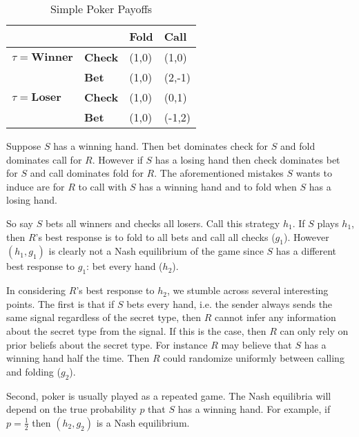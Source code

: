 \documentclass{article}
\begin{document}
\begin{table}[H]
	\centering
	\caption{Simple Poker Payoffs}
	\label{simplepokerpayoffs}
	\begin{tabular}{ll|l|l|}
		\cline{3-4}
		&       & \textbf{Fold} & \textbf{Call} \\ \hline
		\multicolumn{1}{|l|}{$\tau=\textbf{Winner}$} & \textbf{Check} & (1,0)  & (1,0)  \\ \cline{2-4}
		\multicolumn{1}{|l|}{}        & \textbf{Bet}   & (1,0)  & (2,-1)  \\ \hline
		\multicolumn{1}{|l|}{$\tau=\textbf{Loser}$}  & \textbf{Check} & (1,0)  & (0,1)  \\ \cline{2-4}
		\multicolumn{1}{|l|}{}        & \textbf{Bet}   & (1,0)  & (-1,2) \\ \hline
	\end{tabular}
\end{table}

Suppose $S$ has a winning hand. Then bet dominates check for $S$ and fold dominates call for $R$. However if $S$ has a losing hand then check dominates bet for $S$ and call dominates fold for $R$. The aforementioned mistakes $S$ wants to induce are for $R$ to call with $S$ has a winning hand and to fold when $S$ has a losing hand.

So say $S$ bets all winners and checks all losers. Call this strategy $h_1$. If $S$ plays $h_1$, then $R$'s best response is to fold to all bets and call all checks ($g_1$). However $(h_1, g_1)$ is clearly not a Nash equilibrium of the game since $S$ has a different best response to $g_1$: bet every hand ($h_2$).

In considering $R$'s best response to $h_2$, we stumble across several interesting points. The first is that if $S$ bets every hand, i.e. the sender always sends the same signal regardless of the secret type, then $R$ cannot infer any information about the secret type from the signal. If this is the case, then $R$ can only rely on prior beliefs about the secret type. For instance $R$ may believe that $S$ has a winning hand half the time. Then $R$ could randomize uniformly between calling and folding ($g_2$).

Second, poker is usually played as a repeated game. The Nash equilibria will depend on the true probability $p$ that $S$ has a winning hand. For example, if $p = \frac{1}{2}$ then $(h_2, g_2)$ is a Nash equilibrium.
\end{document}
